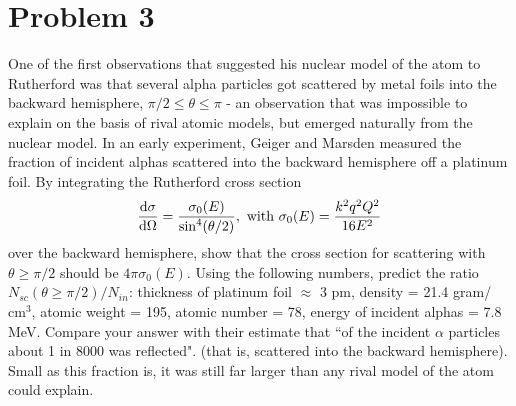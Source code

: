 \documentclass[10pt]{article}
\begin{document}
	\section*{Problem 3}
	One of the first observations that suggested his nuclear model of the atom to Rutherford was that several 
	alpha particles got scattered by metal foils into the backward hemisphere, $\pi/2 \le \theta \le \pi$ - an
	observation that was impossible to explain on the basis of rival atomic models, but emerged naturally 
	from the nuclear model. In an early experiment, Geiger and Marsden measured the fraction of incident alphas
	scattered into the backward hemisphere off a platinum foil. By integrating the Rutherford cross section
	\[
		\dv{\sigma}{\Omega} = \frac{\sigma_0(E)}{\sin^4(\theta/2)}, \text{    with     } \sigma_0(E) =
		\frac{k^2q^2Q^2}{16E^2}
	\] 
	over the backward hemisphere, show that the cross section for scattering with $\theta \ge \pi/2$ should be 
	$4 \pi \sigma_0(E)$. Using the following numbers, predict the ratio $N_{sc}(\theta\ge \pi/2)/N_{in}$: 
	thickness of platinum foil $\approx$ 3 pm, density = 21.4 gram/$\text{cm}^3$, atomic weight = 195, atomic
	number = 78, energy of incident alphas = 7.8 MeV. Compare your answer with their estimate that 
	``of the incident $\alpha$ particles about 1 in 8000 was reflected". (that is, scattered into the backward 
	hemisphere). Small as this fraction is, it was still far larger than any rival model of the atom could 
	explain.
\end{document}
